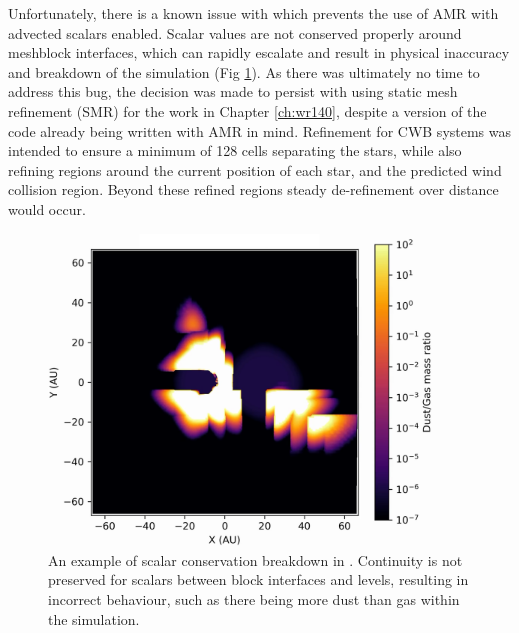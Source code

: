 Unfortunately, there is a known issue with  which prevents the use of AMR with advected scalars enabled.
Scalar values are not conserved properly around meshblock interfaces, which can rapidly escalate and result in physical inaccuracy and breakdown of the simulation (Fig \ref{fig:amrbreakdown}).
As there was ultimately no time to address this bug, the decision was made to persist with using static mesh refinement (SMR) for the work in Chapter \ref{ch:wr140}, despite a version of the code already being written with AMR in mind.
Refinement for CWB systems was intended to ensure a minimum of 128 cells separating the stars, while also refining regions around the current position of each star, and the predicted wind collision region.
Beyond these refined regions steady de-refinement over distance would occur.

\begin{figure}[ht]
  \centering
  \includegraphics[width=4in]{assets/refinement/breakdown.png}
  \caption[AMR breakdown in \athena]{An example of scalar conservation breakdown in \athena. Continuity is not preserved for scalars between block interfaces and levels, resulting in incorrect behaviour, such as there being more dust than gas within the simulation.}
  \label{fig:amrbreakdown}
\end{figure}

